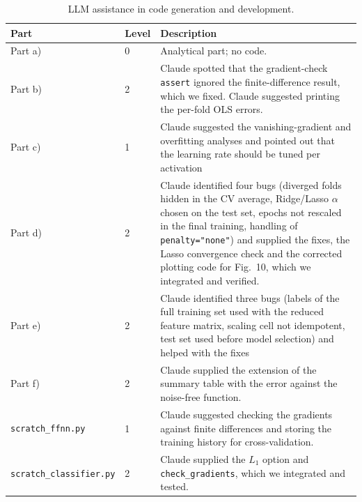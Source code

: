 \documentclass[amssymb,twocolumn,aps]{revtex4}
\begin{document}
\begin{table}[t]
    \centering
    \small
    \begin{tabular}{p{}p{}p{}}
        \hline
        \textbf{Part} & \textbf{Level} & \textbf{Description} \\
        \hline
        Part a) & 0 & Analytical part; no code. \\
        \hline
        Part b) & 2 & Claude spotted that the gradient-check \texttt{assert} ignored the finite-difference result, which we fixed. Claude suggested printing the per-fold OLS errors. \\
        \hline
        Part c) & 1 &  Claude suggested the vanishing-gradient and overfitting analyses and pointed out that the learning rate should be tuned per activation \\
        \hline
        Part d) & 2 & Claude identified four bugs (diverged folds hidden in the CV average, Ridge/Lasso $\alpha$ chosen on the test set, epochs not rescaled in the final training, handling of \texttt{penalty="none"}) and supplied the fixes, the Lasso convergence check and the corrected plotting code for Fig.~10, which we integrated and verified. \\
        \hline
        Part e) & 2 & Claude identified three bugs (labels of the full training set used with the reduced feature matrix, scaling cell not idempotent, test set used before model selection) and helped with the fixes \\
        \hline
        Part f) & 2 & Claude supplied the extension of the summary table with the error against the noise-free function. \\
        \hline
        \texttt{scratch\_\allowbreak ffnn.py} & 1 & Claude suggested checking the gradients against finite differences and storing the training history for cross-validation. \\
        \hline
        \texttt{scratch\_\allowbreak classifier.py} & 2 & Claude supplied the $L_1$ option and \texttt{check\_gradients}, which we integrated and tested. \\
        \hline
    \end{tabular}
    \caption{LLM assistance in code generation and development.}
    \label{tab:llm-code}
\end{table}


  
\end{document}
